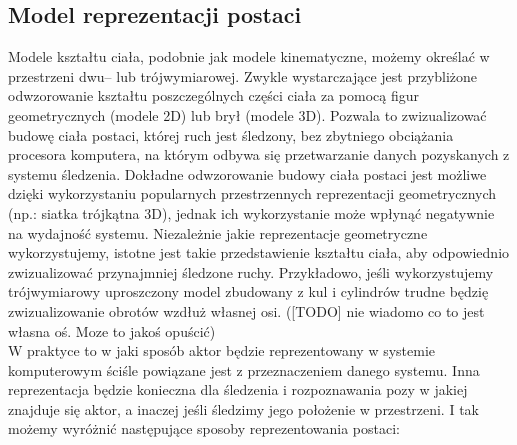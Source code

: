 	\subsection{Model reprezentacji postaci}
	Modele kształtu ciała, podobnie jak modele kinematyczne, możemy określać w przestrzeni dwu-- lub trójwymiarowej. Zwykle wystarczające jest przybliżone odwzorowanie kształtu poszczególnych części ciała za pomocą figur geometrycznych (modele 2D) lub brył (modele 3D). Pozwala to zwizualizować budowę ciała postaci, której ruch jest śledzony, bez zbytniego obciążania procesora komputera, na którym odbywa się przetwarzanie danych pozyskanych z systemu śledzenia. Dokładne odwzorowanie budowy ciała postaci jest możliwe dzięki wykorzystaniu popularnych przestrzennych reprezentacji geometrycznych (np.: siatka trójkątna 3D), jednak ich wykorzystanie może wpłynąć negatywnie na wydajność systemu. 
	Niezależnie jakie reprezentacje geometryczne wykorzystujemy, istotne jest takie przedstawienie kształtu ciała, aby odpowiednio zwizualizować przynajmniej śledzone ruchy. Przykładowo, jeśli wykorzystujemy trójwymiarowy uproszczony model zbudowany z kul i cylindrów trudne będzię zwizualizowanie obrotów wzdłuż własnej osi. ([TODO] nie wiadomo co to jest własna oś. Moze to jakoś opuścić)\\
		
	W praktyce to w jaki sposób aktor będzie reprezentowany w systemie komputerowym ściśle powiązane jest z przeznaczeniem danego systemu. Inna reprezentacja będzie konieczna dla śledzenia i rozpoznawania pozy w jakiej znajduje się aktor, a inaczej jeśli śledzimy jego położenie w przestrzeni. I tak możemy wyróżnić następujące sposoby reprezentowania postaci:
	
